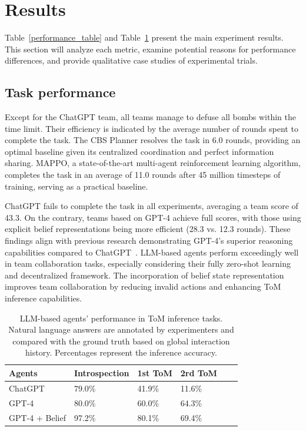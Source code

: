 \documentclass[11pt]{article}
\begin{document}
\section{Results}

Table~\ref{performance_table} and Table~\ref{tom_results} present the main experiment results. This section will analyze each metric, examine potential reasons for performance differences, and provide qualitative case studies of experimental trials.



\subsection{Task performance}
Except for the ChatGPT team, all teams manage to defuse all bombs within the time limit. Their efficiency is indicated by the average number of rounds spent to complete the task. The CBS Planner resolves the task in 6.0 rounds, providing an optimal baseline given its centralized coordination and perfect information sharing. MAPPO, a state-of-the-art multi-agent reinforcement learning algorithm, completes the task in an average of 11.0 rounds after 45 million timesteps of training, serving as a practical baseline.

ChatGPT fails to complete the task in all experiments, averaging a team score of 43.3. On the contrary, teams based on GPT-4 achieve full scores, with those using explicit belief representations being more efficient (28.3 vs. 12.3 rounds). These findings align with previous research demonstrating GPT-4's superior reasoning capabilities compared to ChatGPT~\cite{zheng2023judging}. LLM-based agents perform exceedingly well in team collaboration tasks, especially considering their fully zero-shot learning and decentralized framework. The incorporation of belief state representation improves team collaboration by reducing invalid actions and enhancing ToM inference capabilities.

\begin{table}[htb]
\centering
\begin{tabular}{llllll}
\hline
\textbf{Agents} & \textbf{Introspection}& \textbf{1st ToM}& \textbf{2rd ToM}\\
\hline
ChatGPT  & 79.0\%& 41.9\%& 11.6\%\\
GPT-4 & 80.0\%& 60.0\%& 64.3\% \\
GPT-4 + Belief  & 97.2\%& 80.1\%& 69.4\%\\
\hline
\end{tabular}
\caption{\label{tom_results}
LLM-based agents' performance in ToM inference tasks. Natural language answers are annotated by experimenters and compared with the ground truth based on global interaction history. Percentages represent the inference accuracy.
}
\end{table}
\end{document}
